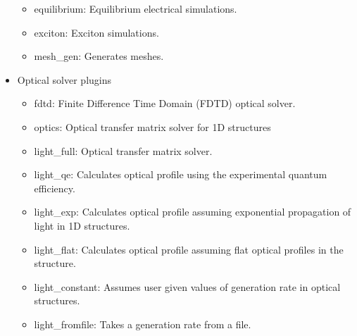 \begin{itemize}
\begin{itemize}
		\vspace{-0.2cm}\item equilibrium: Equilibrium electrical simulations.
		\vspace{-0.2cm}\item exciton: Exciton simulations.
		\vspace{-0.2cm}\item mesh\_gen: Generates meshes.
	\end{itemize}
	\vspace{-0.2cm}\item Optical solver plugins
	\begin{itemize}
		\vspace{-0.2cm}\item fdtd: Finite Difference Time Domain (FDTD) optical solver.
		\vspace{-0.2cm}\item optics: Optical transfer matrix solver for 1D structures
		\vspace{-0.2cm}\item light\_full: Optical transfer matrix solver.
		\vspace{-0.2cm}\item light\_qe: Calculates optical profile using the experimental quantum efficiency.
		\vspace{-0.2cm}\item light\_exp: Calculates optical profile assuming exponential propagation of light in 1D structures.
		\vspace{-0.2cm}\item light\_flat: Calculates optical profile assuming flat optical profiles in the structure.
		\vspace{-0.2cm}\item light\_constant: Assumes user given values of generation rate in optical structures.
		\vspace{-0.2cm}\item light\_fromfile: Takes a generation rate from a file.
	\end{itemize}
\end{itemize}

